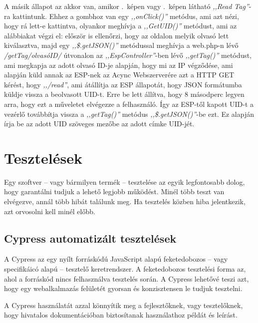 \documentclass[
]{thesis-ekf}
\theoremstyle{definition}
\theoremstyle{remark}
\begin{document}
	A másik állapot az akkor van, amikor .~képen vagy .~képen látható \emph{,,Read Tag''}-ra kattintunk. Ehhez a gombhoz van egy \emph{,,onClick()''} metódus, ami azt nézi, hogy rá lett-e kattintva, olyankor meghívja a \emph{,,GetUID()''} metódust, ami az alábbiakat végzi el: először is ellenőrzi, hogy az oldalon melyik olvasó lett kiválasztva, majd egy \emph{,,\$.getJSON()''} metódussal meghívja a web.php-n lévő \emph{/getTag/olvasóID/} útvonalon az \emph{,,EspController''}-ben lévő \emph{,,getTag()''} metódust, ami megkapja az adott olvasó ID-je alapján, hogy mi az IP végződése, ami alapján küld annak az ESP-nek az Acync Webszerverére azt a HTTP GET kérést, hogy \emph{,,/read''}, ami átállítja az ESP állapotát, hogy JSON formátumba küldje vissza a beolvasott UID-t. Erre be lett állítva, hogy 8 másodperc legyen arra, hogy ezt a műveletet elvégezze a felhasználó. Így az ESP-től kapott UID-t a vezérlő továbbítja vissza a \emph{,,getTag()''} metódus \emph{,,\$.getJSON()''}-be ezt. Ez alapján írja be az adott UID szöveges mezőbe az adott címke UID-jét.
	
	
	\chapter{Tesztelések}
	Egy szoftver -- vagy bármilyen termék -- tesztelése az egyik legfontosabb dolog, hogy garantálni tudjuk a lehető legjobb működést. Minél több teszt van elvégezve, annál több hibát találunk meg. Ha tesztelés közben hiba jelentkezik, azt orvosolni kell minél előbb.
	
	\section{Cypress automatizált tesztelések}
	
	A Cypress az egy nyílt forráskódú JavaScript alapú feketedobozos -- vagy specifikáicó alapú -- tesztelő keretrendszer. A feketedobozos tesztelési forma az, ahol a forráskód nincs felhasználva tesztelés során. A Cypress lehetővé teszi azt, hogy egy webalkalmazás felületét gyorsan és konzisztensen le tudjuk tesztelni. 
	
	A Cypress használatát azzal könnyítik meg a fejlesztőknek, vagy tesztelőknek, hogy hivatalos dokumentációban biztosítanak használathoz példát és leírást.\cite{cypress-docs}
	
\end{document}
